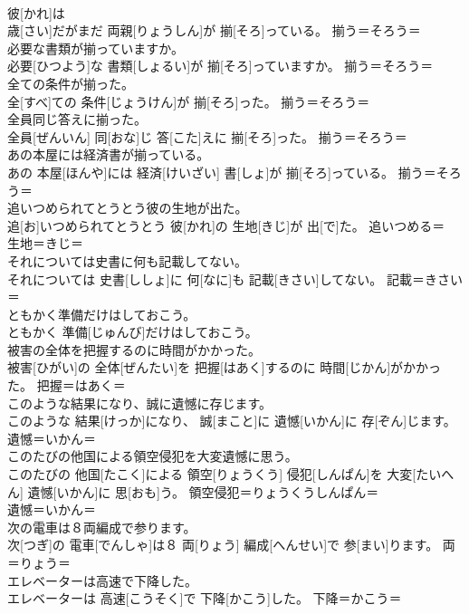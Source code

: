 \documentclass[8pt]{extreport}
\begin{document}
\begin{CJK}{UTF8}{min}
\\	彼[かれ]は 
\\	歳[さい]だがまだ 両親[りょうしん]が 揃[そろ]っている。	揃う＝そろう＝ 
\\	必要な書類が揃っていますか。	
\\	必要[ひつよう]な 書類[しょるい]が 揃[そろ]っていますか。	揃う＝そろう＝ 
\\	全ての条件が揃った。	
\\	全[すべ]ての 条件[じょうけん]が 揃[そろ]った。	揃う＝そろう＝ 
\\	全員同じ答えに揃った。	
\\	全員[ぜんいん] 同[おな]じ 答[こた]えに 揃[そろ]った。	揃う＝そろう＝ 
\\	あの本屋には経済書が揃っている。	
\\	あの 本屋[ほんや]には 経済[けいざい] 書[しょ]が 揃[そろ]っている。	揃う＝そろう＝ 
\\	追いつめられてとうとう彼の生地が出た。	
\\	追[お]いつめられてとうとう 彼[かれ]の 生地[きじ]が 出[で]た。	追いつめる＝ 
\\	生地＝きじ＝ 
\\	それについては史書に何も記載してない。	
\\	それについては 史書[ししょ]に 何[なに]も 記載[きさい]してない。	記載＝きさい＝ 
\\	ともかく準備だけはしておこう。	
\\	ともかく 準備[じゅんび]だけはしておこう。	
\\	被害の全体を把握するのに時間がかかった。	
\\	被害[ひがい]の 全体[ぜんたい]を 把握[はあく]するのに 時間[じかん]がかかった。	把握＝はあく＝ 
\\	このような結果になり、誠に遺憾に存じます。	
\\	このような 結果[けっか]になり、 誠[まこと]に 遺憾[いかん]に 存[ぞん]じます。	遺憾＝いかん＝ 
\\	このたびの他国による領空侵犯を大変遺憾に思う。	
\\	このたびの 他国[たこく]による 領空[りょうくう] 侵犯[しんぱん]を 大変[たいへん] 遺憾[いかん]に 思[おも]う。	領空侵犯＝りょうくうしんぱん＝ 
\\	遺憾＝いかん＝ 
\\	次の電車は８両編成で参ります。	
\\	次[つぎ]の 電車[でんしゃ]は８ 両[りょう] 編成[へんせい]で 参[まい]ります。	両＝りょう＝ 
\\	エレベーターは高速で下降した。	
\\	エレベーターは 高速[こうそく]で 下降[かこう]した。	下降＝かこう＝ 

\end{CJK}
\end{document}
